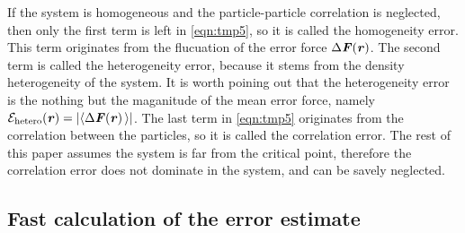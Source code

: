 \documentclass[aps,pre,preprint]{revtex4-1}
\renewcommand{\v}[1]{\textbf{\textit{#1}}}
\begin{document}
If the system is homogeneous and the particle-particle correlation is
neglected, then only the first term is left in \eqref{eqn:tmp5}, so it
is called the homogeneity error.  This term originates from the
flucuation of the error force $\Delta\v F(\v r)$.  The second term is
called the heterogeneity error, because it stems from the density
heterogeneity of the system. It is worth poining out that the
heterogeneity error is the nothing but the maganitude of the mean error force,
namely $\mathcal E_{\textrm{hetero}}(\v r) = \vert\langle\Delta\v F(\v
r)\,\rangle\vert$.  The last term in \eqref{eqn:tmp5} originates from the
correlation between the particles, so it is called the correlation
error.
The rest of this paper
assumes the system is far from the critical point, therefore the
correlation error does not dominate in the system, and can be savely
neglected.



\subsection{Fast calculation of the error estimate}\label{sec:tmp1.3}
\end{document}
